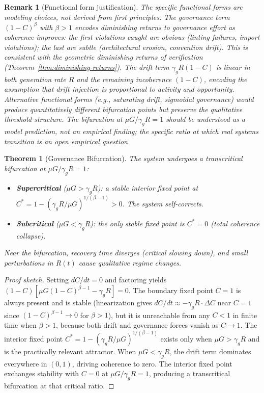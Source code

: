 \documentclass[11pt, a4paper, logo, copyright]{googledeepmind}
\newtheorem{theorem}{Theorem}[section]
\newtheorem*{remark}{Remark}
\begin{document}
\begin{remark}[Functional form justification]
The specific functional forms are modeling choices, not derived from first principles. The governance term $(1-C)^\beta$ with $\beta > 1$ encodes diminishing returns to governance effort as coherence improves: the first violations caught are obvious (linting failures, import violations); the last are subtle (architectural erosion, convention drift). This is consistent with the geometric diminishing returns of verification (Theorem~\ref{thm:diminishing-returns}). The drift term $\gamma_g R(1-C)$ is linear in both generation rate $R$ and the remaining incoherence $(1-C)$, encoding the assumption that drift injection is proportional to activity and opportunity. Alternative functional forms (e.g., saturating drift, sigmoidal governance) would produce quantitatively different bifurcation points but preserve the qualitative threshold structure. The bifurcation at $\mu G / \gamma_g R = 1$ should be understood as a model prediction, not an empirical finding; the specific ratio at which real systems transition is an open empirical question.
\end{remark}

\begin{theorem}[Governance Bifurcation]
\label{thm:bifurcation}
The system undergoes a transcritical bifurcation at $\mu G / \gamma_g R = 1$:
\begin{itemize}
    \item \textbf{Supercritical} ($\mu G > \gamma_g R$): a stable interior fixed point at $C^* = 1 - (\gamma_g R / \mu G)^{1/(\beta-1)} > 0$. The system self-corrects.
    \item \textbf{Subcritical} ($\mu G < \gamma_g R$): the only stable fixed point is $C^* = 0$ (total coherence collapse).
\end{itemize}
Near the bifurcation, recovery time diverges (critical slowing down), and small perturbations in $R(t)$ cause qualitative regime changes.
\end{theorem}

\begin{proof}[Proof sketch]
Setting $dC/dt = 0$ and factoring yields $(1 - C)[\mu G (1 - C)^{\beta - 1} - \gamma_g R] = 0$. The boundary fixed point $C = 1$ is always present and is stable (linearization gives $dC/dt \approx -\gamma_g R \cdot \Delta C$ near $C = 1$ since $(1-C)^{\beta-1} \to 0$ for $\beta > 1$), but it is unreachable from any $C < 1$ in finite time when $\beta > 1$, because both drift and governance forces vanish as $C \to 1$. The interior fixed point $C^* = 1 - (\gamma_g R / \mu G)^{1/(\beta - 1)}$ exists only when $\mu G > \gamma_g R$ and is the practically relevant attractor. When $\mu G < \gamma_g R$, the drift term dominates everywhere in $(0, 1)$, driving coherence to zero. The interior fixed point exchanges stability with $C = 0$ at $\mu G / \gamma_g R = 1$, producing a transcritical bifurcation at that critical ratio.
\end{proof}
\end{document}
